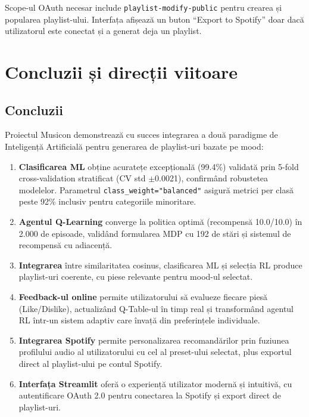 \documentclass[12pt,a4paper]{article}
\begin{document}
Scope-ul OAuth necesar include \texttt{playlist-modify-public} pentru crearea și popularea playlist-ului. Interfața afișează un buton ``Export to Spotify'' doar dacă utilizatorul este conectat și a generat deja un playlist.

\FloatBarrier

\section{Concluzii și direcții viitoare}

\subsection{Concluzii}

Proiectul Musicon demonstrează cu succes integrarea a două paradigme de Inteligență Artificială pentru generarea de playlist-uri bazate pe mood:

\begin{enumerate}
    \item \textbf{Clasificarea ML} obține acuratețe excepțională (99.4\%) validată prin 5-fold cross-validation stratificat (CV std $\pm$0.0021), confirmând robustetea modelelor. Parametrul \texttt{class\_weight="balanced"} asigură metrici per clasă peste 92\% inclusiv pentru categoriile minoritare.

    \item \textbf{Agentul Q-Learning} converge la politica optimă (recompensă 10.0/10.0) în 2.000 de episoade, validând formularea MDP cu 192 de stări și sistemul de recompensă cu adiacență.

    \item \textbf{Integrarea} între similaritatea cosinus, clasificarea ML și selecția RL produce playlist-uri coerente, cu piese relevante pentru mood-ul selectat.

    \item \textbf{Feedback-ul online} permite utilizatorului să evalueze fiecare piesă (Like/Dislike), actualizând Q-Table-ul în timp real și transformând agentul RL într-un sistem adaptiv care învață din preferințele individuale.

    \item \textbf{Integrarea Spotify} permite personalizarea recomandărilor prin fuziunea profilului audio al utilizatorului cu cel al preset-ului selectat, plus exportul direct al playlist-ului pe contul Spotify.

    \item \textbf{Interfața Streamlit} oferă o experiență utilizator modernă și intuitivă, cu autentificare OAuth 2.0 pentru conectarea la Spotify și export direct de playlist-uri.
\end{enumerate}
\end{document}
